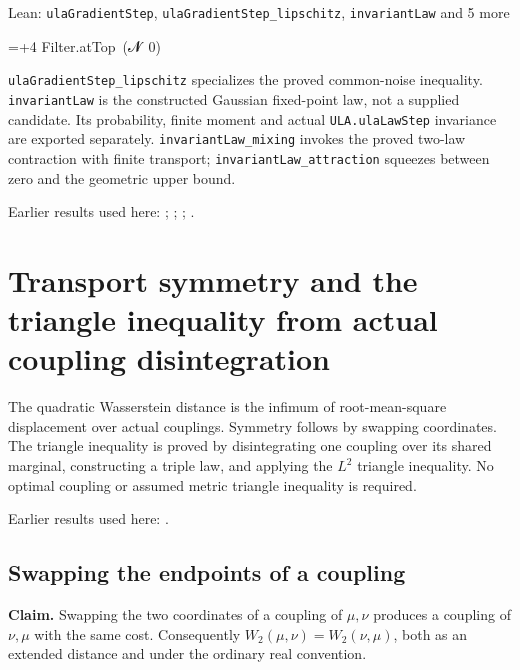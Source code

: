 \documentclass[11pt,a4paper]{report}
\newlength{\leancharwidth}
\newenvironment{leancode}{\par\smallskip\begingroup\ttfamily\footnotesize\raggedright
  \settowidth{\leancharwidth}{M}\setlength{\parskip}{0pt}\setlength{\parindent}{0pt}
  \frenchspacing}{\par\endgroup\smallskip}
\newcommand{\leanline}[2]{\hangindent=\dimexpr#1\leancharwidth+4\leancharwidth\relax
  \hangafter=1\noindent\hspace*{#1\leancharwidth}#2\par}
\newcommand{\leanlabel}[1]{\par\smallskip\noindent{\small\bfseries #1}\par}
\begin{document}
\begin{leanbox}{Lean: \texttt{ulaGradientStep}, \texttt{ulaGradientStep\_\allowbreak{}lipschitz}, \texttt{invariantLaw} and 5 more}
\begin{leancode}
\leanline{6}{Filter.atTop\ ({\leanfallback 𝓝}\ 0)}
\end{leancode}
\leanlabel{How the Lean proof follows the argument}
\texttt{ula\allowbreak{}Gradient\allowbreak{}Step\_\allowbreak{}lipschitz} specializes the proved common-noise inequality. \texttt{invariant\allowbreak{}Law} is the constructed Gaussian fixed-point law, not a supplied candidate. Its probability, finite moment and actual \texttt{ULA.\allowbreak{}ula\allowbreak{}Law\allowbreak{}Step} invariance are exported separately. \texttt{invariant\allowbreak{}Law\_\allowbreak{}mixing} invokes the proved two-law contraction with finite transport; \texttt{invariant\allowbreak{}Law\_\allowbreak{}attraction} squeezes between zero and the geometric upper bound.
\end{leanbox}


Earlier results used here: \cite[Section~3.17.4]{LangevinLean2026ULASC}; \cite[Section~3.21.2]{LangevinLean2026ULASC}; \cite[Section~3.34.1]{LangevinLean2026ULASC}; \cite[Section~3.36.7]{LangevinLean2026ULASC}.
\section{\texorpdfstring{Transport symmetry and the triangle inequality from actual coupling disintegration}{Transport symmetry and the triangle inequality from actual coupling disintegration}}
\label{proof-module-WassersteinMixing-TransportGeometry-lean}


The quadratic Wasserstein distance is the infimum of root-mean-square displacement over actual couplings. Symmetry follows by swapping coordinates. The triangle inequality is proved by disintegrating one coupling over its shared marginal, constructing a triple law, and applying the \(L^2\) triangle inequality. No optimal coupling or assumed metric triangle inequality is required.



Earlier results used here: \cite[Section~3.22]{LangevinLean2026ULASC}.
\subsection{\texorpdfstring{Swapping the endpoints of a coupling}{Swapping the endpoints of a coupling}}
\label{report-step-WassersteinMixing-TransportGeometry-lean-1}


\textbf{Claim.} Swapping the two coordinates of a coupling of \(\mu,\nu\) produces a coupling of \(\nu,\mu\) with the same cost. Consequently \(W_2(\mu,\nu)=W_2(\nu,\mu)\), both as an extended distance and under the ordinary real convention.
\end{document}
